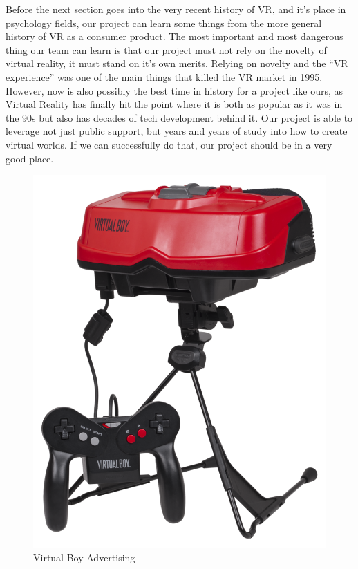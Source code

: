 \documentclass[a4paper,10pt,twoside]{article}
\begin{document}
	Before the next section goes into the very recent history of VR, and it’s place in psychology fields, our project can learn some things from the more general history of VR as a consumer product.  The most important and most dangerous thing our team can learn is that our project must not rely on the novelty of virtual reality, it must stand on it’s own merits.  Relying on novelty and the “VR experience” was one of the main things that killed the VR market in 1995.  However, now is also possibly the best time in history for a project like ours, as Virtual Reality has finally hit the point where it is both as popular as it was in the 90s but also has decades of tech development behind it.  Our project is able to leverage not just public support, but years and years of study into how to create virtual worlds.  If we can successfully do that, our project should be in a very good place.
		\begin{figure}[H]
			\includegraphics[scale=0.7]{virtualBoy.png}
			\caption{Virtual Boy Advertising}
			\label{fig:vBoy}
		\end{figure}
\end{document}
